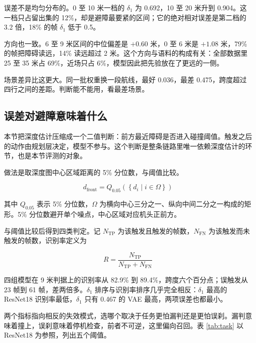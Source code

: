 \documentclass[12pt,a4paper]{ctexart}
\begin{document}
误差不是均匀分布的。0 至 10 米一档的 $\delta_1$ 为 0.692，10 至 20 米升到 0.904。这一档只占留出集的 12\%，却是避障最要紧的区间；它的绝对相对误差是第二档的 3.2 倍，18\% 的帧 $\delta_1$ 低于 0.5。

方向也一致。6 至 9 米区间的中位偏差是 $+0.60$ 米，0 至 6 米是 $+1.08$ 米，79\% 的帧把障碍读远，14\% 读远超过 2 米。这个方向与语料的构成有关：全部数据里 25 至 35 米占 69\%，近场只占 6\%，模型因此把先验放在了更远的一侧。

场景差异比这更大。同一批权重换一段航线，最好 0.036，最差 0.475，跨度超过四行之间的差距。判断能不能用，看最差场景。

\subsection{误差对避障意味着什么}
\label{sec:decision}

本节把深度估计压缩成一个二值判断：前方最近障碍是否进入碰撞阈值。触发之后的动作由规划层决定，模型不参与。这个判断是整条链路里唯一依赖深度估计的环节，也是本节评测的对象。

做法是取深度图中心区域距离的 5\% 分位数，与阈值比较。

\begin{equation}
d_{\mathrm{front}} = Q_{0.05}\left(\left\{d_i \mid i \in \Omega\right\}\right)
\label{eq:front}
\end{equation}

其中 $Q_{0.05}$ 表示 5\% 分位数，$\Omega$ 为横向中心三分之一、纵向中间二分之一构成的矩形。5\% 分位数避开单个噪点，中心区域对应机头正前方。

与阈值比较后得到四类判定。记 $N_{\mathrm{TP}}$ 为该触发且触发的帧数，$N_{\mathrm{FN}}$ 为该触发而未触发的帧数，识别率定义为

\begin{equation}
R = \frac{N_{\mathrm{TP}}}{N_{\mathrm{TP}} + N_{\mathrm{FN}}}
\label{eq:recall}
\end{equation}

四组模型在 9 米判据上的识别率从 82.9\% 到 89.4\%，跨度六个百分点；误触发从 23 帧到 61 帧，差两倍多。$\delta_1$ 排序与识别率排序几乎完全相反：$\delta_1$ 最高的 ResNet18 识别率最低，$\delta_1$ 只有 0.467 的 VAE 最高，两项误差也都最小。

两个指标指向相反的失效模式，选哪个取决于任务更怕漏判还是更怕误刹。漏判意味着撞上，误刹意味着停机检查，前者不可逆，这里偏向召回。表 \ref{tab:task} 以 ResNet18 为参照，列出五个阈值。
\end{document}
